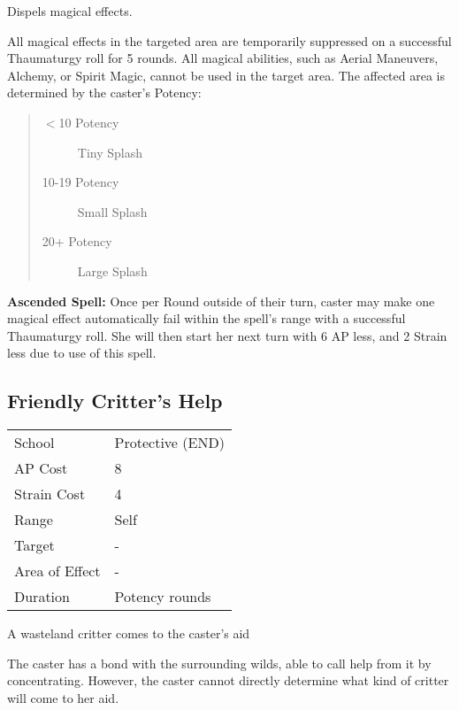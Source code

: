 \documentclass[11pt,a4paper,twocolumn]{book}
\begin{document}
\medskip

Dispels magical effects.

All magical effects in the targeted area are temporarily suppressed on a successful Thaumaturgy roll for 5 rounds. All magical abilities, such as Aerial Maneuvers, Alchemy, or Spirit Magic, cannot be used in the target area. The affected area is determined by the caster's Potency:

\begin{quote}
	\begin{description}
		\item[$<$10 Potency] 	Tiny Splash
		\item[10-19 Potency] 	Small Splash
		\item[20+ Potency] 	Large Splash
	\end{description}
\end{quote}

\bigskip

\textbf{Ascended Spell:} Once per Round outside of their turn, caster may make one magical effect automatically fail within the spell's range with a successful Thaumaturgy roll. She will then start her next turn with 6 AP less, and 2 Strain less due to use of this spell. 


\subsection*{Friendly Critter's Help}
{
	\begin{tabu} to 75mm{| X[l,4] | X[l,7] |}
		\hline
		School 			& Protective (END) 		\\
		AP Cost	      	& 8						\\
		Strain Cost     & 4 					\\
		Range     		& Self 					\\
		Target      	& -						\\
		Area of Effect  & -  	 				\\
		Duration     	& Potency rounds 		\\ \hline
	\end{tabu}
	
}

\medskip

A wasteland critter comes to the caster's aid

The caster has a bond with the surrounding wilds, able to call help from it by concentrating. However, the caster cannot directly determine what kind of critter will come to her aid.
\end{document}
